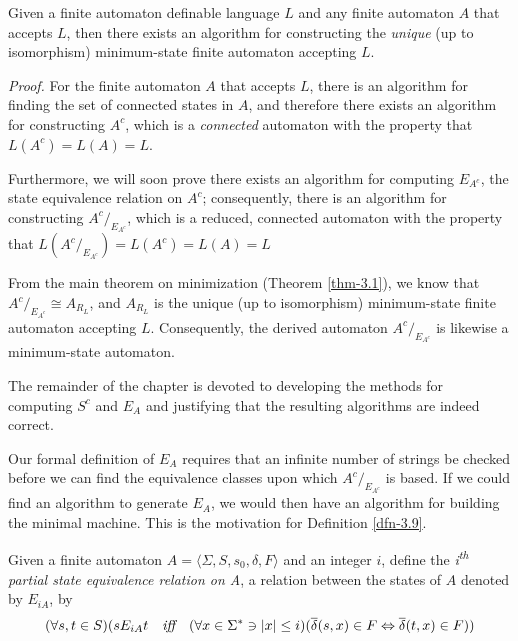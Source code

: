 \begin{thm}\label{thm-3.7}
Given a finite automaton definable language $L$ and any finite automaton $A$
that accepts $L$, then there exists an algorithm for constructing the \emph{unique}
(up to isomorphism) minimum-state finite automaton accepting $L$.

\emph{Proof.} For the finite automaton $A$ that accepts $L$, there is an
algorithm for finding the set of connected states in $A$, and therefore there
exists an algorithm for constructing $A^c$, which is a \emph{connected} automaton with
the property that $L(A^c) = L(A) = L$.

Furthermore, we will soon prove there exists an algorithm for computing $E_{A^c}$, the state equivalence
relation on $A^c$; consequently, there is an algorithm for constructing
$A^c / _{E_{A^c}}$, which is a reduced, connected automaton with the property that
$L(A^c / _{E_{A^c}}) = L(A^c) = L(A) = L$

From the main theorem on minimization (Theorem \ref{thm-3.1}), we know that
$A^c / _{E_{A^c}} \cong A_{R_L}$, and $A_{R_L}$ is the unique (up to isomorphism)
minimum-state finite automaton accepting $L$. Consequently, the derived
automaton $A^c/ _{E_{A^c}}$ is likewise a minimum-state automaton.
\end{thm}

The remainder of the chapter is devoted to developing the methods for computing
$S^c$ and $E_A$ and justifying that the resulting algorithms are indeed correct.

Our formal definition of $E_A$ requires that an infinite number of strings be
checked before we can find the equivalence classes upon which $A^c / _{E_{A^c}}$
is based. If we could find an algorithm to generate $E_A$, we would then have an
algorithm for building the minimal machine. This is the motivation for
Definition \ref{dfn-3.9}.

\begin{dfn}\label{dfn-3.9}
Given a finite automaton $A =\langle\Sigma,S,s_0,\delta,F\rangle$ and an integer
$i$, define the \emph{i\textsuperscript{th} partial state equivalence relation on A}, a
relation between the states of $A$ denoted by $E_{iA}$, by
\[ (\forall s,t \in S)(sE_{iA}t \ \ \ \emph{iff}\ \ \  (\forall x \in \Sigma^* \ni |x|
	\leq  i)(\DBAR(s,x) \in F \Leftrightarrow \DBAR(t,x) \in F)) \]
\end{dfn}

